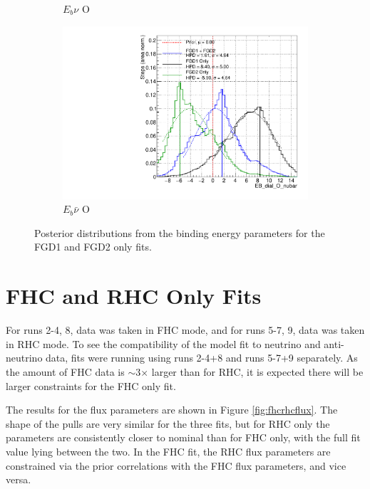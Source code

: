 \begin{figure}
\begin{subfigure}{.48\textwidth}
  \caption{$E_{b}\nu$ O}
\end{subfigure}
\begin{subfigure}{.48\textwidth}
  \centering
  \includegraphics[width=0.73\linewidth]{figs/FGD_EB_dial_O_nubar}
  \caption{$E_{b}\bar{\nu}$ O}
\end{subfigure}
\caption{Posterior distributions from the binding energy parameters for the FGD1 and FGD2 only fits.}
\label{fig:FGDEbdata}
\end{figure}

\section{FHC and RHC Only Fits}

For runs 2-4, 8, data was taken in FHC mode, and for runs 5-7, 9, data was taken in RHC mode. To see the compatibility of the model fit to neutrino and anti-neutrino data, fits were running using runs 2-4+8 and runs 5-7+9 separately. As the amount of FHC data is $\sim$3$\times$ larger than for RHC, it is expected there will be larger constraints for the FHC only fit.

The results for the flux parameters are shown in Figure \ref{fig:fhcrhcflux}. The shape of the pulls are very similar for the three fits, but for RHC only the parameters are consistently closer to nominal than for FHC only, with the full fit value lying between the two. In the FHC fit, the RHC flux parameters are constrained via the prior correlations with the FHC flux parameters, and vice versa.

